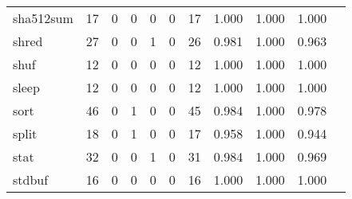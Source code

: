 \begin{longtable}{lp{1.10cm}p{1.10cm}p{1.10cm}p{1.10cm}p{1.10cm}p{1.10cm}p{1.10cm}p{1.10cm}p{1.10cm}p{1.10cm}}
sha512sum &                     17 &                                  0 &                                 0 &                                0 &                                 0 &                              17 &                          1.000 &                                 1.000 &                               1.000 \\
shred     &                     27 &                                  0 &                                 0 &                                1 &                                 0 &                              26 &                          0.981 &                                 1.000 &                               0.963 \\
shuf      &                     12 &                                  0 &                                 0 &                                0 &                                 0 &                              12 &                          1.000 &                                 1.000 &                               1.000 \\
sleep     &                     12 &                                  0 &                                 0 &                                0 &                                 0 &                              12 &                          1.000 &                                 1.000 &                               1.000 \\
sort      &                     46 &                                  0 &                                 1 &                                0 &                                 0 &                              45 &                          0.984 &                                 1.000 &                               0.978 \\
split     &                     18 &                                  0 &                                 1 &                                0 &                                 0 &                              17 &                          0.958 &                                 1.000 &                               0.944 \\
stat      &                     32 &                                  0 &                                 0 &                                1 &                                 0 &                              31 &                          0.984 &                                 1.000 &                               0.969 \\
stdbuf    &                     16 &                                  0 &                                 0 &                                0 &                                 0 &                              16 &                          1.000 &                                 1.000 &                               1.000 \\

\end{longtable}
